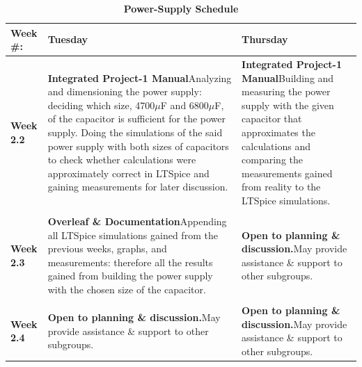 \begin{table}[h!]
\centering

\captionsetup{justification=centering, labelfont=bf}
\caption{\textbf{Power-Supply Schedule}}
\begin{tabular*}{\textwidth}{@{\extracolsep{\fill}} p{} p{} p{} @{}} 
\toprule
     \textbf{Week \#:} & \textbf{Tuesday} & \textbf{Thursday} \\
     \midrule
    {\textbf{Week 2.2 }}
    & {\textbf{Integrated Project-1 Manual}\newline Analyzing and dimensioning the power supply: deciding which size, 4700$\mu$F and 6800$\mu$F,  of the capacitor is sufficient for the power supply. Doing the simulations of the said power supply with both sizes of capacitors to check whether calculations were approximately correct in LTSpice and gaining measurements for later discussion.}
    & {\textbf{Integrated Project-1 Manual}\newline Building and measuring the power supply with the given capacitor that approximates the calculations and comparing the measurements gained from reality to the LTSpice simulations.}\\
    \vspace{10pt}\\
    
    {\textbf{Week 2.3 }}
    & {\textbf{Overleaf \& Documentation}\newline Appending all LTSpice simulations gained from the previous weeks, graphs, and measurements: therefore all the results gained from building the power supply with the chosen size of the capacitor.} 
    & {\textbf{Open to planning \& discussion.}\newline May provide assistance \& support to other subgroups.}\\
    \vspace{6pt}\\
    
    {\textbf{Week 2.4}} 
    & {\textbf{Open to planning \& discussion.}\newline May provide assistance \& support to other subgroups.}
    & {\textbf{Open to planning \& discussion.}\newline May provide assistance \& support to other subgroups.}\\

     \bottomrule
\end{tabular*}

\label{tab:PS schedule}
\end{table}

